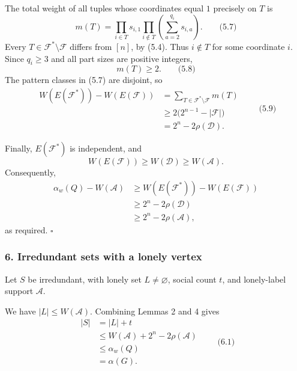 \documentclass[
  11pt,
  a4paper,
]{article}
\begin{document}
The total weight of all tuples whose coordinates equal \(1\) precisely
on \(T\) is \[
m(T)=
\prod_{i\in T}s_{i,1}
\prod_{i\notin T}\left(\sum_{a=2}^{q_i}s_{i,a}\right).
\qquad\text{(5.7)}
\] Every \(T\in\mathcal F^\ast\setminus\mathcal F\) differs from
\([n]\), by (5.4). Thus \(i\notin T\) for some coordinate \(i\). Since
\(q_i\ge3\) and all part sizes are positive integers, \[
m(T)\ge2.
\qquad\text{(5.8)}
\] The pattern classes in (5.7) are disjoint, so \begin{equation*}
\begin{aligned}
W(E(\mathcal F^\ast))-W(E(\mathcal F))
&=\sum_{T\in\mathcal F^\ast\setminus\mathcal F}m(T)\\
&\ge2\bigl(2^{n-1}-|\mathcal F|\bigr)\\
&=2^n-2\rho(\mathcal D).
\end{aligned}
\qquad\text{(5.9)}
\end{equation*}

Finally, \(E(\mathcal F^\ast)\) is independent, and \[
W(E(\mathcal F))\ge W(\mathcal D)\ge W(\mathcal A).
\] Consequently, \begin{equation*}
\begin{aligned}
\alpha_w(Q)-W(\mathcal A)
&\ge W(E(\mathcal F^\ast))-W(E(\mathcal F))\\
&\ge 2^n-2\rho(\mathcal D)\\
&\ge 2^n-2\rho(\mathcal A),
\end{aligned}
\end{equation*} as required. \(\square\)

\subsubsection{6. Irredundant sets with a lonely
vertex}\label{irredundant-sets-with-a-lonely-vertex}

Let \(S\) be irredundant, with lonely set \(L\ne\varnothing\), social
count \(t\), and lonely-label support \(\mathcal A\).

We have \(|L|\le W(\mathcal A)\). Combining Lemmas 2 and 4 gives
\begin{equation*}
\begin{aligned}
|S|
&=|L|+t\\
&\le W(\mathcal A)+2^n-2\rho(\mathcal A)\\
&\le\alpha_w(Q)\\
&=\alpha(G).
\end{aligned}
\qquad\text{(6.1)}
\end{equation*}
\end{document}
